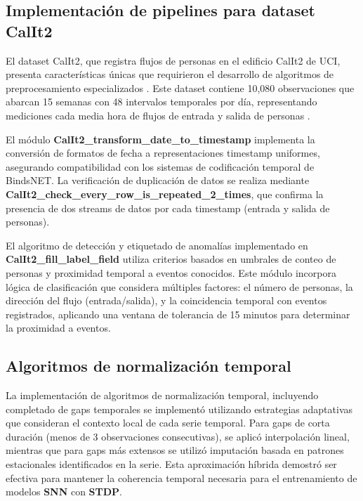 \subsection{Implementación de pipelines para dataset CalIt2}

El dataset CalIt2, que registra flujos de personas en el edificio CalIt2 de UCI, presenta características únicas que requirieron el desarrollo de algoritmos de preprocesamiento especializados \cite{UCI_Calit2_2009}. Este dataset contiene 10,080 observaciones que abarcan 15 semanas con 48 intervalos temporales por día, representando mediciones cada media hora de flujos de entrada y salida de personas \cite{UCI_Calit2_2009}.

El módulo \textbf{CalIt2\_transform\_date\_to\_timestamp} implementa la conversión de formatos de fecha a representaciones timestamp uniformes, asegurando compatibilidad con los sistemas de codificación temporal de BindsNET. La verificación de duplicación de datos se realiza mediante \textbf{CalIt2\_check\_every\_row\_is\_repeated\_2\_times}, que confirma la presencia de dos streams de datos por cada timestamp (entrada y salida de personas). 

El algoritmo de detección y etiquetado de anomalías implementado en \textbf{CalIt2\_fill\_label\_field} utiliza criterios basados en umbrales de conteo de personas y proximidad temporal a eventos conocidos. Este módulo incorpora lógica de clasificación que considera múltiples factores: el número de personas, la dirección del flujo (entrada/salida), y la coincidencia temporal con eventos registrados, aplicando una ventana de tolerancia de 15 minutos para determinar la proximidad a eventos. 

\subsection{Algoritmos de normalización temporal}

La implementación de algoritmos de normalización temporal, incluyendo completado de gaps temporales se implementó utilizando estrategias adaptativas que consideran el contexto local de cada serie temporal. Para gaps de corta duración (menos de 3 observaciones consecutivas), se aplicó interpolación lineal, mientras que para gaps más extensos se utilizó imputación basada en patrones estacionales identificados en la serie. Esta aproximación híbrida demostró ser efectiva para mantener la coherencia temporal necesaria para el entrenamiento de modelos \textbf{SNN} con \textbf{STDP}.

